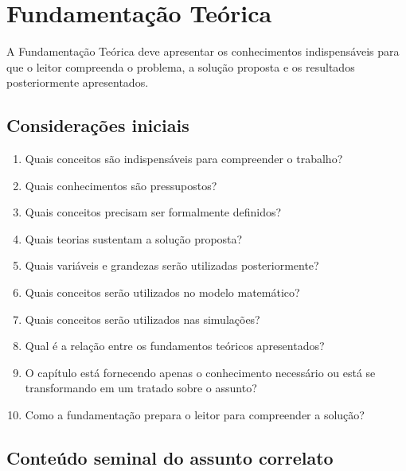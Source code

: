 \chapter{Fundamentação Teórica}

A Fundamentação Teórica deve apresentar os conhecimentos indispensáveis para
que o leitor compreenda o problema, a solução proposta e os resultados
posteriormente apresentados.

\section{Considerações iniciais}

\begin{enumerate}
	\item Quais conceitos são indispensáveis para compreender o trabalho?
	\item Quais conhecimentos são pressupostos?
	\item Quais conceitos precisam ser formalmente definidos?
	\item Quais teorias sustentam a solução proposta?
	\item Quais variáveis e grandezas serão utilizadas posteriormente?
	\item Quais conceitos serão utilizados no modelo matemático?
	\item Quais conceitos serão utilizados nas simulações?
	\item Qual é a relação entre os fundamentos teóricos apresentados?
	\item O capítulo está fornecendo apenas o conhecimento necessário ou está se transformando em um tratado sobre o assunto?
	\item Como a fundamentação prepara o leitor para compreender a solução?
\end{enumerate}

\section{Conteúdo seminal do assunto correlato}

